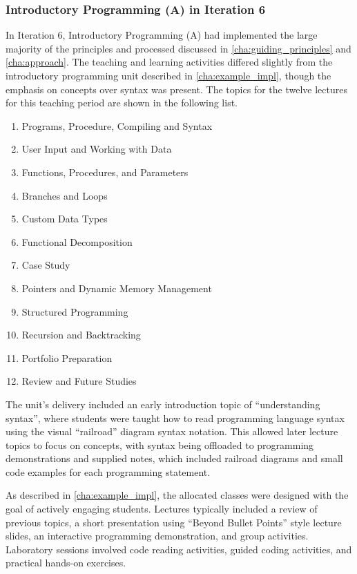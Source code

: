 \subsubsection{Introductory Programming (A) in Iteration 6} %
\label{sub:intro_prog_i6}

In Iteration 6, Introductory Programming (A) had implemented the large majority of the principles and processed discussed in \cref{cha:guiding_principles} and \cref{cha:approach}. The teaching and learning activities differed slightly from the introductory programming unit described in \cref{cha:example_impl}, though the emphasis on concepts over syntax was present. The topics for the twelve lectures for this teaching period are shown in the following list.
\begin{enumerate}
  \item Programs, Procedure, Compiling and Syntax
  \item User Input and Working with Data
  \item Functions, Procedures, and Parameters
  \item Branches and Loops
  \item Custom Data Types
  \item Functional Decomposition
  \item Case Study
  \item Pointers and Dynamic Memory Management
  \item Structured Programming
  \item Recursion and Backtracking
  \item Portfolio Preparation
  \item Review and Future Studies
\end{enumerate}

The unit's delivery included an early introduction topic of ``understanding syntax'', where students were taught how to read programming language syntax using the visual ``railroad'' diagram syntax notation. This allowed later lecture topics to focus on concepts, with syntax being offloaded to programming demonstrations and supplied notes, which included railroad diagrams and small code examples for each programming statement.

As described in \cref{cha:example_impl}, the allocated classes were designed with the goal of actively engaging students. Lectures typically included a review of previous topics, a short presentation using ``Beyond Bullet Points'' style lecture slides, an interactive programming demonstration, and group activities. Laboratory sessions involved code reading activities, guided coding activities, and practical hands-on exercises.

